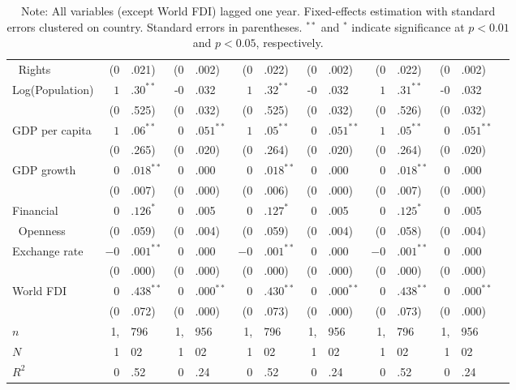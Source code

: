 \documentclass[12pt,onesided]{amsart}
\begin{document}
\begin{table}[ht]
{\begin{tabular}{lr@{} lr@{}lr@{}lr@{}lr@{}lr@{}lr@{} }
	$\;\;$Rights & (0&.021) & (0&.002) & (0&.022) & (0&.002) & (0&.022) & (0&.002) \\
	\multirow{2}{*}{Log(Population)} & $1$&$.30^{\ast\ast}$ & -0&.032 & $1$&$.32^{\ast\ast}$ & -0&.032 & $1$&$.31^{\ast\ast}$ & -0&.032 \\
	& (0&.525) & (0&.032) & (0&.525) & (0&.032) & (0&.526) & (0&.032) \\
	\multirow{2}{*}{GDP per capita} & $1$&$.06^{\ast\ast}$ & $0$&$.051^{\ast\ast}$ & $1$&$.05^{\ast\ast}$ & $0$&$.051^{\ast\ast}$ & $1$&$.05^{\ast\ast}$ & $0$&$.051^{\ast\ast}$ \\
	& (0&.265) & (0&.020) & (0&.264) & (0&.020) & (0&.264) & (0&.020) \\
	\multirow{2}{*}{GDP growth} & $0$&$.018^{\ast\ast}$ & 0&.000 & $0$&$.018^{\ast\ast}$ & 0&.000 & $0$&$.018^{\ast\ast}$ & 0&.000 \\
	& (0&.007) & (0&.000) & (0&.006) & (0&.000) & (0&.007) &(0&.000) \\
	Financial & $0$&$.126^{\ast}$ & 0&.005 & $0$&$.127^{\ast}$ & 0&.005 & $0$&$.125^{\ast}$ & 0&.005 \\
	$\;\;$Openness & (0&.059) & (0&.004) & (0&.059) & (0&.004) & (0&.058) &(0&.004) \\
	\multirow{2}{*}{Exchange rate} & $-0$&$.001^{\ast\ast}$ & 0&.000 & $-0$&$.001^{\ast\ast}$ & 0&.000 & $-0$&$.001^{\ast\ast}$ & 0&.000 \\
	& (0&.000) & (0&.000) & (0&.000) & (0&.000) & (0&.000) &(0&.000) \\	
	\multirow{2}{*}{World FDI} & $0$&$.438^{\ast\ast}$ & $0$&$.000^{\ast\ast}$ & $0$&$.430^{\ast\ast}$ & $0$&$.000^{\ast\ast}$ & $0$&$.438^{\ast\ast}$ & $0$&$.000^{\ast\ast}$ \\
	& (0&.072) & (0&.000) & (0&.073) & (0&.000) & (0&.073) &(0&.000) \\ \hline
	$n$ & 1,&796 & 1,&956 & 1,&796 & 1,&956 & 1,&796 & 1,&956 \\
	$N$ & 1&02 & 1&02 & 1&02 & 1&02 & 1&02 & 1&02 \\
	$R^{2}$ & 0&.52 & 0&.24 & 0&.52 & 0&.24 & 0&.52 & 0&.24 \\
	\hline\hline
\end{tabular}
\caption*{Note: All variables (except World FDI) lagged one year. Fixed-effects estimation with standard errors clustered on country. Standard errors in parentheses. $^{**}$ and $^{*}$ indicate significance at $p<0.01$ and $p<0.05$, respectively.}
}
\end{table}
\end{document}
